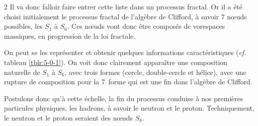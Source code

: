 \begin{multicols}{2}
Il va donc falloir faire entrer cette liste dans un processus fractal.
Or il a été choisi initialement le processus fractal de l'algèbre de
Clifford, à savoir 7 nœuds possibles, les $S_1$ à $S_6$. Ces
nœuds vont donc être composés de vorespaces massiques, en progression
de la loi fractale.

On peut se les représenter et obtenir quelques informations
caractéristiques (\textit{cf.} tableau \ref{tblr:5-0-1}).
On voit donc clairement apparaître une composition naturelle de $S_1$ à
$S_6$, avec trois formes (cercle, double-cercle et hélice), avec une rupture
de composition pour la 7\ieme\ forme qui est une fin dans l'algèbre de
Clifford.

Postulons donc qu'à cette échelle, la fin du processus conduise à nos
premières particules physiques, les hadrons, à savoir le neutron et le
proton. Techniquement, le neutron et le proton seraient des nœuds $S_8$.

\begin{table}[H]
	\centering
	\caption{\footnotesize{\textbf{Nœuds de l'algèbre de Clifford $S_{7,0}(\mathbb{R}$)}}}
	\label{tblr:5-0-1}


\end{table}
\end{multicols}

